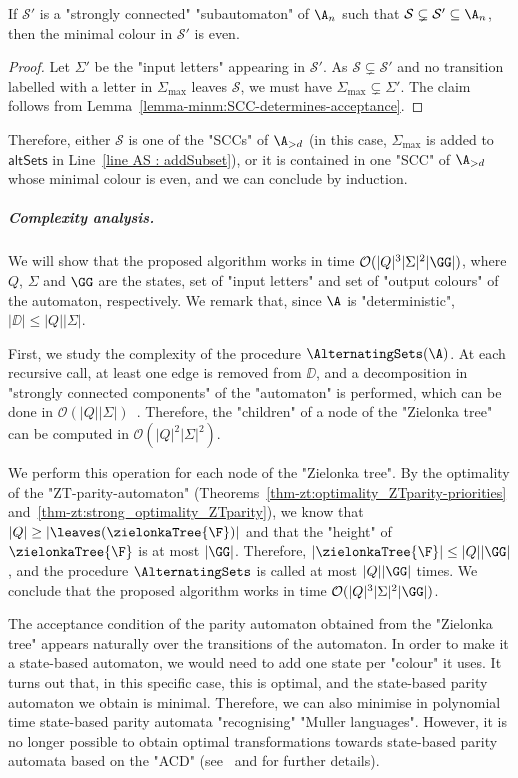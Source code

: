 \documentclass[10pt,a4paper]{amsart}
\newenvironment{subproof}[1][Proof]{\begin{proof}[#1]\renewcommand{\qedsymbol}{$\blacksquare$}}{\end{proof}}
\renewcommand{\O}{\mathcal{O}}
\renewcommand{\S}{\mathcal{S}}
\renewcommand{\SS}{\Sigma}
\begin{document}
\begin{claim}
	If $\S'$ is a "strongly connected" "subautomaton" of $\A_n$ such that $\S\subsetneq \S' \subseteq \A_n$, then the minimal colour in $\S'$ is even.
\end{claim}
\begin{subproof}
	Let $\SS'$ be the "input letters" appearing in $\S'$.
	As $\S\subsetneq \S'$ and no transition labelled with a letter in $\SS_{\max}$ leaves $\S$, we must have $\SS_{\max}\subsetneq \SS'$. The claim follows from Lemma~\ref{lemma-minm:SCC-determines-acceptance}.
\end{subproof}

Therefore, either $\S$ is one of the "SCCs" of $\A_{>d}$ (in this case, $\SS_{\max}$ is added to $\mathsf{altSets}$ in Line~\ref{line AS : addSubset}), or it is contained in one "SCC" of $\A_{>d}$ whose minimal colour is even, and we can conclude by induction.


\subparagraph{Complexity analysis.}
We will show that the proposed algorithm works in time $\O(|Q|^3|\SS|^2|\GG|)$, where $Q$, $\SS$ and $\GG$ are the states, set of "input letters" and set of "output colours" of the automaton, respectively.
We remark that, since $\A$ is "deterministic", $|\DD|\leq |Q||\SS|$.

First, we study the complexity of the procedure $\AlternatingSets(\A)$. At each recursive call, at least one edge is removed from $\DD$, and a decomposition in "strongly connected components" of the "automaton" is performed, which can be done in $\O(|Q||\SS|)$~\cite{Tarjan72DepthFirst}. Therefore, the "children" of a node of the "Zielonka tree" can be computed in $\O(|Q|^2|\SS|^2)$.

We perform this operation for each node of the "Zielonka tree". By the optimality of the "ZT-parity-automaton" (Theorems~\ref{thm-zt:optimality_ZTparity-priorities} and~\ref{thm-zt:strong_optimality_ZTparity}), we know that $|Q| \geq |\leaves(\zielonkaTree{\F})|$ and that the "height" of $\zielonkaTree{\F}$ is at most $|\GG|$. Therefore, $|\zielonkaTree{\F}| \leq |Q||\GG|$, and the procedure $\AlternatingSets$ is called at most $|Q||\GG|$ times. We conclude that the proposed algorithm works in time $\O(|Q|^3|\SS|^2|\GG|)$.



\begin{remark}
    The acceptance condition of the parity automaton obtained from the "Zielonka tree" appears naturally over the transitions of the automaton. In order to make it a state-based automaton, we would need to add one state per "colour" it uses. It turns out that, in this specific case, this is optimal, and the state-based parity automaton we obtain is minimal. Therefore, we can also minimise in polynomial time state-based parity automata "recognising" "Muller languages".
    However, it is no longer possible to obtain optimal transformations towards state-based parity automata based on the "ACD" (see~\cite[Section~5.3]{CDMRS22Tacas} and \cite[Section~I.8]{Casares23Thesis} for further details).
\end{remark}
\end{document}
